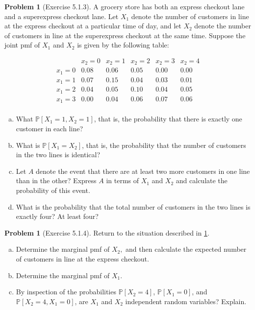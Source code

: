\documentclass[10pt]{article}
\theoremstyle{definition}
\newtheorem{problem}[theorem]{Problem}
\newcommand{\1}[1]{\textbf{1}_{\left[#1\right]}} %
\def\P{\mathbb{P}} %
\begin{document}
\begin{problem}[Exercise 5.1.3]
  \label{problem:exercise-5.1.3}
  A grocery store has both an express checkout lane and a superexpress
  checkout lane. Let $X_{1}$ denote the number of customers in line at the
  express checkout at a particular time of day, and let $X_{2}$ denote the
  number of customers in line at the superexpress checkout at the same time.
  Suppose the joint pmf of $X_{1}$ and $X_{2}$ is given by the following
  table:

  \begin{equation*}
    \begin{array}{c|ccccc}
      & x_2=0 & x_2=1 & x_2=2 & x_2=3 & x_2=4 \\ \hline
      x_1=0 & 0.08 & 0.06 & 0.05 & 0.00 & 0.00 \\
      x_1=1 & 0.07 & 0.15 & 0.04 & 0.03 & 0.01 \\
      x_1=2 & 0.04 & 0.05 & 0.10 & 0.04 & 0.05 \\
      x_1=3 & 0.00 & 0.04 & 0.06 & 0.07 & 0.06 \\
    \end{array}
  \end{equation*}
  \begin{enumerate}[(a)]
    \item What $\P\left[X_{1}=1,X_{2}=1 \right]$, that is, the probability
    that there is exactly one customer in each line?
    \item What is $\P\left[X_{1}=X_{2}\right]$, that is, the probability that
    the number of customers in the two lines is identical?
    \item Let $A$ denote the event that there are at least two more customers
    in one line than in the other? Express $A$ in terms of $X_{1}$ and $X_{2}$
    and calculate the probability of this event.
    \item What is the probability that the total number of customers in the
    two lines is exactly four? At least four?
  \end{enumerate}
\end{problem}

\begin{problem}[Exercise 5.1.4]
  Return to the situation described in \cref{problem:exercise-5.1.3}.
  \begin{enumerate}[(a)]
    \item Determine the marginal pmf of $X_{2},$ and then calculate the
    expected number of customers in line at the express checkout.
    \item Determine the marginal pmf of $X_{1}$.
    \item By inspection of the probabilities $\P\left[X_{2}=4 \right]$,
    $\P\left[X_{1}=0 \right]$, and $\P\left[X_{2}=4,X_{1}=0 \right]$, are
    $X_{1}$ and $X_{2}$ independent random variables? Explain.
  \end{enumerate}
\end{problem}
\end{document}
